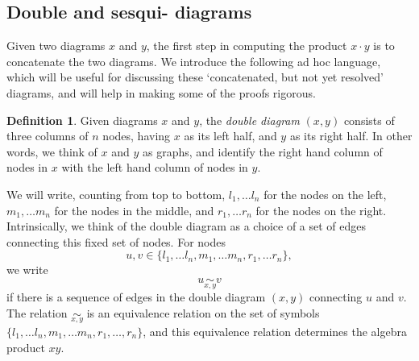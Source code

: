 \documentclass[12pt]{amsart}
\theoremstyle{plain}
\theoremstyle{definition} \newtheorem{definition}[theorem]{Definition}
\theoremstyle{plain}
\theoremstyle{plain} \newtheorem{proposition}[theorem]{Proposition}
\theoremstyle{plain} \newtheorem{conjecture}[theorem]{Conjecture}
\theoremstyle{plain} \newtheorem{corollary}[theorem]{Corollary}
\theoremstyle{remark} \newtheorem{claim}[theorem]{Claim}
\theoremstyle{remark} \newtheorem{remark}[theorem]{Remark}
\theoremstyle{remark} \newtheorem{example}[theorem]{Example}
\theoremstyle{remark} \newtheorem{comment}[theorem]{Comment}
\theoremstyle{definition} \newtheorem{question}[theorem]{Question}
\begin{document}
\subsection{Double and sesqui- diagrams}

Given two diagrams $x$ and $y$, the first step in computing the product $x \cdot y$ is to concatenate the two diagrams. We introduce the following ad hoc language, which will be useful for discussing these `concatenated, but not yet resolved' diagrams, and will help in making some of the proofs rigorous.

\begin{definition} Given diagrams $x$ and $y$, the \emph{double diagram} $(x,y)$ consists of three columns of $n$ nodes, having $x$ as its left half, and $y$ as its right half. In other words, we think of $x$ and $y$ as graphs, and identify the right hand column of nodes in $x$ with the left hand column of nodes in $y$. 

We will write, counting from top to bottom, $l_1, \dots l_n$ for the nodes on the left, $m_1, \dots m_n$ for the nodes in the middle, and $r_1, \dots r_n$ for the nodes on the right. Intrinsically, we think of the double diagram as a choice of a set of edges connecting this fixed set of nodes. For nodes $$u,v \in \{ l_1, \dots l_n , m_1, \dots m_n, r_1, \dots r_n\},$$ we write $$u \underset{x,y}{\sim} v$$ if there is a sequence of edges in the double diagram $(x,y)$ connecting $u$ and $v$. The relation $\underset{x,y}{\sim}$ is an equivalence relation on the set of symbols $\{ l_1, \dots l_n , m_1, \dots m_n, r_1, \dots, r_n\}$, and this equivalence relation determines the algebra product $xy$. \end{definition}
\end{document}
